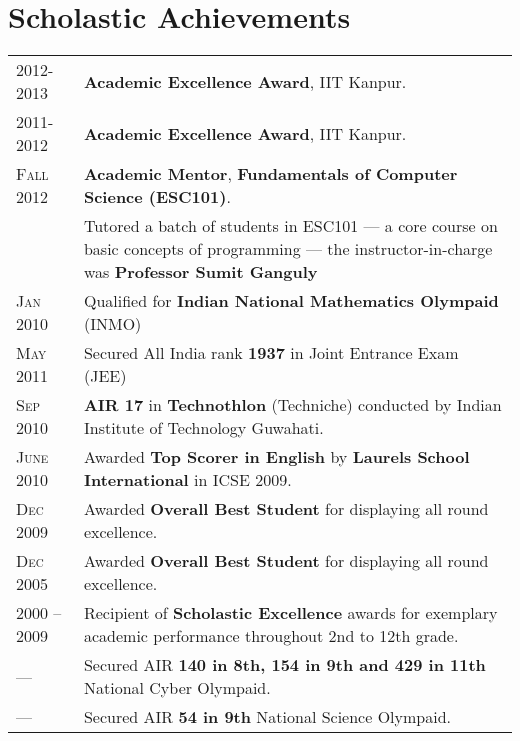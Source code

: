 \documentclass[a4paper,10pt]{article} %
\begin{document}
\section{Scholastic Achievements}

\begin{tabular}{>{\raggedleft}p{2.2cm}p{15cm}}

    \textsc{2012-2013}   & \textbf{Academic Excellence Award}, IIT Kanpur. \\
    \textsc{2011-2012}   & \textbf{Academic Excellence Award}, IIT Kanpur. \\
    \textsc{Fall 2012}   & \textbf{Academic Mentor}, \textbf{Fundamentals of Computer Science (ESC101)}. \\
                         & \footnotesize{Tutored a batch of students in ESC101 --- a core course on
                            basic concepts of programming --- the instructor-in-charge was \textbf{Professor
                            Sumit Ganguly}}\\
    \textsc{Jan 2010}    & Qualified for \textbf{Indian National Mathematics Olympaid} (INMO) \\
    \textsc{May 2011}    & Secured All India rank \textbf{1937} in Joint Entrance Exam (JEE) \\
    \textsc{Sep 2010}    & \textbf{AIR 17} in \textbf{Technothlon} (Techniche) conducted by Indian Institute of Technology Guwahati. \\
    \textsc{June 2010}   & Awarded \textbf{Top Scorer in English} by \textbf{Laurels School International} in ICSE 2009. \\
    \textsc{Dec 2009}    & Awarded \textbf{Overall Best Student} for displaying all round excellence. \\
    \textsc{Dec 2005}    & Awarded \textbf{Overall Best Student} for displaying all round excellence. \\
    \textsc{2000 -- 2009} & Recipient of \textbf{Scholastic Excellence} awards for exemplary academic
                           performance throughout 2nd to 12th grade. \\
    \textsc{---} & Secured AIR \textbf{140 in 8th, 154 in 9th and 429 in 11th} National Cyber Olympaid.\\
    \textsc{---} & Secured AIR \textbf{54 in 9th} National Science Olympaid.\\

\end{tabular}

\end{document}
